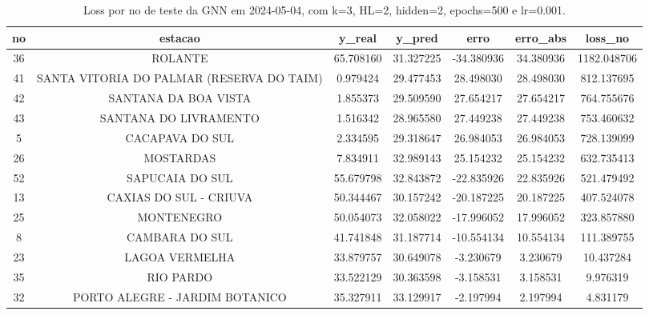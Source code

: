\begin{table}[h]
\centering
\caption{Loss por no de teste da GNN em 2024-05-04, com k=3, HL=2, hidden=2, epochs=500 e lr=0.001.}
\label{tab:gnn_loss_k3_hl2_h2_e500_d20240504}
\begin{tabular}{ccccccc}
\toprule
no & estacao & y\_real & y\_pred & erro & erro\_abs & loss\_no \\
\midrule
36 & ROLANTE & 65.708160 & 31.327225 & -34.380936 & 34.380936 & 1182.048706 \\
41 & SANTA VITORIA DO PALMAR (RESERVA DO TAIM) & 0.979424 & 29.477453 & 28.498030 & 28.498030 & 812.137695 \\
42 & SANTANA DA BOA VISTA & 1.855373 & 29.509590 & 27.654217 & 27.654217 & 764.755676 \\
43 & SANTANA DO LIVRAMENTO & 1.516342 & 28.965580 & 27.449238 & 27.449238 & 753.460632 \\
5 & CACAPAVA DO SUL & 2.334595 & 29.318647 & 26.984053 & 26.984053 & 728.139099 \\
26 & MOSTARDAS & 7.834911 & 32.989143 & 25.154232 & 25.154232 & 632.735413 \\
52 & SAPUCAIA DO SUL & 55.679798 & 32.843872 & -22.835926 & 22.835926 & 521.479492 \\
13 & CAXIAS DO SUL - CRIUVA & 50.344467 & 30.157242 & -20.187225 & 20.187225 & 407.524078 \\
25 & MONTENEGRO & 50.054073 & 32.058022 & -17.996052 & 17.996052 & 323.857880 \\
8 & CAMBARA DO SUL & 41.741848 & 31.187714 & -10.554134 & 10.554134 & 111.389755 \\
23 & LAGOA VERMELHA & 33.879757 & 30.649078 & -3.230679 & 3.230679 & 10.437284 \\
35 & RIO PARDO & 33.522129 & 30.363598 & -3.158531 & 3.158531 & 9.976319 \\
32 & PORTO ALEGRE - JARDIM BOTANICO & 35.327911 & 33.129917 & -2.197994 & 2.197994 & 4.831179 \\
\bottomrule
\end{tabular}
\end{table}

